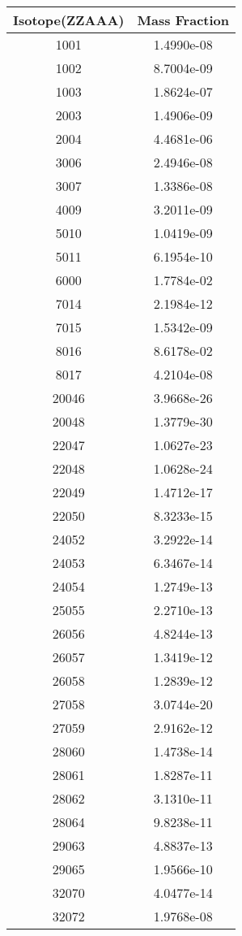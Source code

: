 \begin{table}[h!]
\centering
\begin{tabular}{|| c || c |}
\hline
Isotope(ZZAAA) & Mass Fraction \\
\hline \hline

1001 & 1.4990e-08 \\
1002 & 8.7004e-09 \\
1003 & 1.8624e-07 \\
2003 & 1.4906e-09 \\
2004 & 4.4681e-06 \\
3006 & 2.4946e-08 \\
3007 & 1.3386e-08 \\
4009 & 3.2011e-09 \\
5010 & 1.0419e-09 \\
5011 & 6.1954e-10 \\
6000 & 1.7784e-02 \\
7014 & 2.1984e-12 \\
7015 & 1.5342e-09 \\
8016 & 8.6178e-02 \\
8017 & 4.2104e-08 \\
20046 & 3.9668e-26 \\
20048 & 1.3779e-30 \\
22047 & 1.0627e-23 \\
22048 & 1.0628e-24 \\
22049 & 1.4712e-17 \\
22050 & 8.3233e-15 \\
24052 & 3.2922e-14 \\
24053 & 6.3467e-14 \\
24054 & 1.2749e-13 \\
25055 & 2.2710e-13 \\
26056 & 4.8244e-13 \\
26057 & 1.3419e-12 \\
26058 & 1.2839e-12 \\
27058 & 3.0744e-20 \\
27059 & 2.9162e-12 \\
28060 & 1.4738e-14 \\
28061 & 1.8287e-11 \\
28062 & 3.1310e-11 \\
28064 & 9.8238e-11 \\
29063 & 4.8837e-13 \\
29065 & 1.9566e-10 \\
32070 & 4.0477e-14 \\
32072 & 1.9768e-08 \\

\end{tabular}
\end{table}
